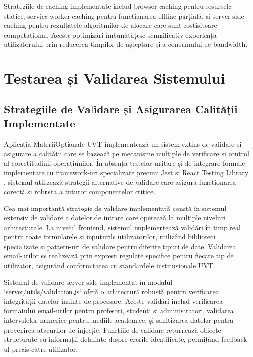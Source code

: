 \documentclass[12pt,a4paper]{report}
\begin{document}
Strategiile de caching implementate includ browser caching pentru resursele statice, service worker caching pentru funcționarea offline parțială, și server-side caching pentru rezultatele algoritmilor de alocare care sunt costisitoare computațional. Aceste optimizări îmbunătățesc semnificativ experiența utilizatorului prin reducerea timpilor de așteptare și a consumului de bandwidth.

\chapter{Testarea și Validarea Sistemului}

\section{Strategiile de Validare și Asigurarea Calității Implementate}

Aplicația MateriiOptionale UVT implementează un sistem extins de validare și asigurare a calității care se bazează pe mecanisme multiple de verificare și control al corectitudinii operațiunilor. În absența testelor unitare și de integrare formale implementate cu framework-uri specializate precum Jest \cite{jest} și React Testing Library \cite{testing-library}, sistemul utilizează strategii alternative de validare care asigură funcționarea corectă și robusta a tuturor componentelor critice.

Cea mai importantă strategie de validare implementată constă în sistemul extensiv de validare a datelor de intrare care operează la multiple niveluri arhitecturale. La nivelul frontend, sistemul implementează validări în timp real pentru toate formularele și inputurile utilizatorilor, utilizând biblioteci specializate și pattern-uri de validare pentru diferite tipuri de date. Validarea email-urilor se realizează prin expresii regulate specifice pentru fiecare tip de utilizator, asigurând conformitatea cu standardele institusionale UVT.

Sistemul de validare server-side implementat în modulul `server/utils/validation.js` oferă o arhitectură robustă pentru verificarea integrității datelor înainte de procesare. Aceste validări includ verificarea formatului email-urilor pentru profesori, studenți și administratori, validarea intervalelor numerice pentru mediile academice, și sanitizarea datelor pentru prevenirea atacurilor de injecție. Funcțiile de validare returnează obiecte structurate cu informații detaliate despre erorile identificate, permițând feedback-ul precis către utilizator.
\end{document}
